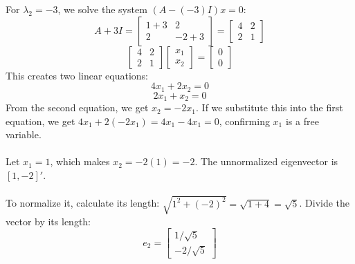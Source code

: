 \documentclass{article}
\begin{document}
For $\lambda_2 = -3$, we solve the system $(A - (-3)I)x = 0$:
\[
A + 3I = \begin{bmatrix} 1+3 & 2 \\ 2 & -2+3 \end{bmatrix} = \begin{bmatrix} 4 & 2 \\ 2 & 1 \end{bmatrix}
\]
\[
\begin{bmatrix} 4 & 2 \\ 2 & 1 \end{bmatrix} \begin{bmatrix} x_1 \\ x_2 \end{bmatrix} = \begin{bmatrix} 0 \\ 0 \end{bmatrix}
\]
This creates two linear equations:
\[
4x_1 + 2x_2 = 0
\]
\[
2x_1 + x_2 = 0
\]
From the second equation, we get $x_2 = -2x_1$. If we substitute this into the first equation, we get $4x_1 + 2(-2x_1) = 4x_1 - 4x_1 = 0$, confirming $x_1$ is a free variable.  \\ \\
Let $x_1 = 1$, which makes $x_2 = -2(1) = -2$. The unnormalized eigenvector is $[1, -2]'$. \\ \\
To normalize it, calculate its length: $\sqrt{1^2 + (-2)^2} = \sqrt{1 + 4} = \sqrt{5}$. Divide the vector by its length:
\[
e_2 = \begin{bmatrix} 1/\sqrt{5} \\ -2/\sqrt{5} \end{bmatrix}
\]
\end{document}
